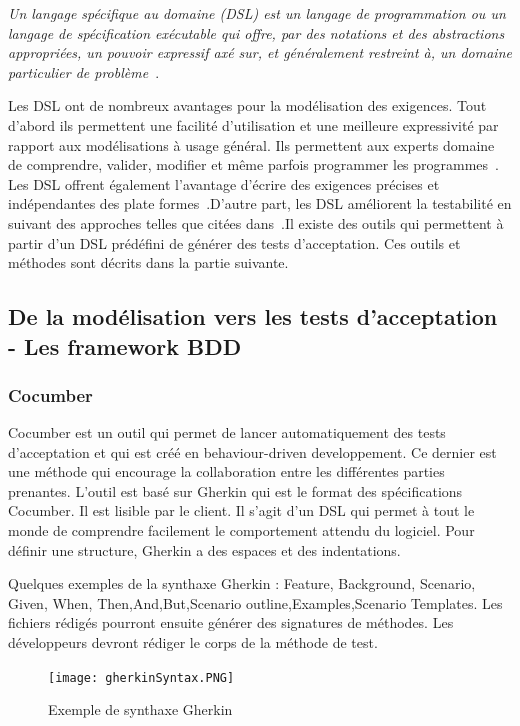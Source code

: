    
        \textit{Un langage spécifique au domaine (DSL) est un langage de programmation ou un langage de spécification exécutable qui offre, par des notations et des abstractions appropriées, un pouvoir expressif axé sur, et généralement restreint à, un domaine particulier de problème}~\cite{article4}.
    
        Les DSL ont de nombreux avantages pour la modélisation des exigences. Tout d'abord ils permettent une facilité d'utilisation et une meilleure expressivité par rapport aux modélisations à usage général. Ils permettent aux experts domaine de comprendre, valider, modifier et même parfois programmer les programmes~\cite{article4,article3}. Les DSL offrent également l'avantage d'écrire des exigences précises et indépendantes des plate formes~\cite{article3}.D'autre part, les DSL améliorent la testabilité en suivant des approches telles que citées dans~\cite{article11,article4}.Il existe des outils qui permettent à partir d'un DSL prédéfini de générer des tests d'acceptation. Ces outils et méthodes sont décrits dans la partie suivante.

    \subsection{De la modélisation vers les tests d'acceptation - Les framework BDD}

        \subsubsection{Cocumber}

        Cocumber est un outil qui permet de lancer automatiquement des tests d'acceptation et qui est créé en behaviour-driven developpement. Ce dernier est une méthode qui encourage la collaboration entre les différentes parties prenantes. L'outil est basé sur Gherkin qui est le format des spécifications Cocumber. Il est lisible par le client. Il s'agit d'un DSL qui permet à tout le monde de comprendre facilement le comportement attendu du logiciel. Pour définir une structure, Gherkin a des espaces et des indentations. 
        
        Quelques exemples de la synthaxe Gherkin : Feature, Background, Scenario, Given, When, Then,And,But,Scenario outline,Examples,Scenario Templates. Les fichiers rédigés pourront ensuite générer des signatures de méthodes. Les développeurs devront rédiger le corps de la méthode de test. 
        
            \begin{figure}[H]
                \centering
                \texttt{[image: gherkinSyntax.PNG]}
                \caption{Exemple de synthaxe Gherkin}
            \end{figure}
        
